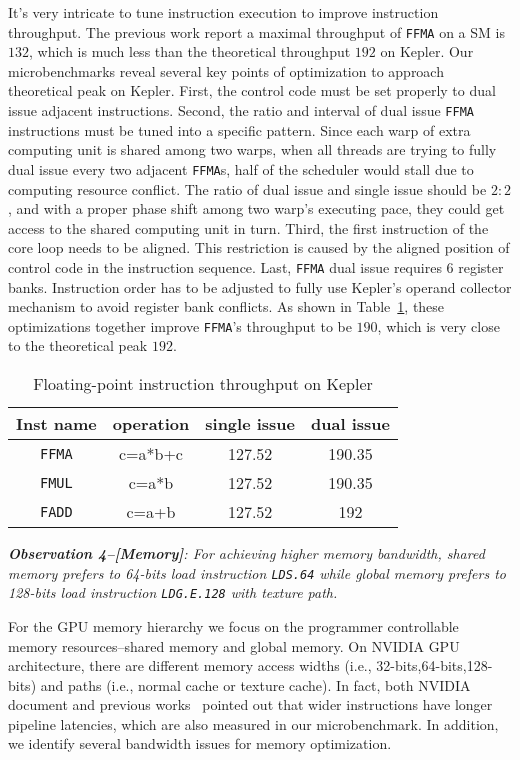 It's very intricate to tune instruction execution to improve instruction throughput. The previous work report a maximal throughput of {\tt FFMA} on a SM is $132$, which is much less than the theoretical throughput $192$ on Kepler. Our microbenchmarks reveal several key points of optimization to approach theoretical peak on Kepler. First, the control code must be set properly to dual issue adjacent instructions. Second, the ratio and interval of dual issue {\tt FFMA} instructions must be tuned into a specific pattern. Since each warp of extra computing unit is shared among two warps, when all threads are trying to fully dual issue every two adjacent {\tt FFMA}s, half of the scheduler would stall due to computing resource conflict. The ratio of dual issue and single issue should be $2:2$, and with a proper phase shift among two warp's executing pace, they could get access to the shared computing unit in turn. Third, the first instruction of the core loop needs to be aligned. This restriction is caused by the aligned position of control code in the instruction sequence. Last, {\tt FFMA} dual issue requires 6 register banks. Instruction order has to be adjusted to fully use Kepler's operand collector mechanism to avoid register bank conflicts. As shown in Table~\ref{tab:ffma}, these optimizations together improve {\tt FFMA}'s throughput  to be $190$, which is very close to the theoretical peak $192$.

\begin{table}[htbp]
\caption{Floating-point instruction throughput on Kepler}
\centering
\scalebox{1.} {
\begin{tabular}{|c||c|c|c|}
\hline
Inst name&operation&single issue&dual issue\\
\hline
{\tt FFMA} &c=a*b+c&127.52&190.35 \\
\hline
{\tt FMUL} &c=a*b&127.52&190.35 \\
\hline
{\tt FADD} &c=a+b&127.52&192\\
\hline
\end{tabular}
}
\label{tab:ffma}
\end{table}


{\em {\bf Observation 4--[Memory]}: For achieving higher memory bandwidth, shared memory prefers to 64-bits load instruction {\tt LDS.64} while global memory prefers to 128-bits load instruction {\tt LDG.E.128} with texture path.}

For the GPU memory hierarchy we focus on the programmer controllable memory resources--shared memory and global memory. On NVIDIA GPU architecture, there are different memory access widths (i.e., 32-bits,64-bits,128-bits) and paths (i.e., normal cache or texture cache). In fact, both NVIDIA document and previous works~\cite{} pointed out that wider instructions have longer pipeline latencies, which are also measured in our microbenchmark. In addition, we identify several bandwidth issues for memory optimization.

